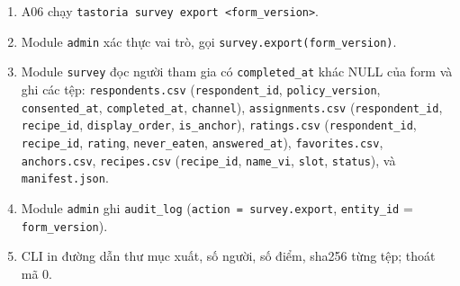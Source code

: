 \begin{enumerate}
\item A06 chạy {\small\texttt{tastoria survey export <form\_\allowbreak{}\allowbreak{}version>}}.
\item Module {\small\texttt{admin}} xác thực vai trò, gọi {\small\texttt{survey.\allowbreak{}export(form\_\allowbreak{}\allowbreak{}version)}}.
\item Module {\small\texttt{survey}} đọc người tham gia có {\small\texttt{completed\_\allowbreak{}\allowbreak{}at}} khác NULL của form và ghi các tệp: {\small\texttt{respondents.\allowbreak{}csv}} ({\small\texttt{respondent\_\allowbreak{}\allowbreak{}id}}, {\small\texttt{policy\_\allowbreak{}\allowbreak{}version}}, {\small\texttt{consented\_\allowbreak{}\allowbreak{}at}}, {\small\texttt{completed\_\allowbreak{}\allowbreak{}at}}, {\small\texttt{channel}}), {\small\texttt{assignments.\allowbreak{}csv}} ({\small\texttt{respondent\_\allowbreak{}\allowbreak{}id}}, {\small\texttt{recipe\_\allowbreak{}\allowbreak{}id}}, {\small\texttt{display\_\allowbreak{}\allowbreak{}order}}, {\small\texttt{is\_\allowbreak{}\allowbreak{}anchor}}), {\small\texttt{ratings.\allowbreak{}csv}} ({\small\texttt{respondent\_\allowbreak{}\allowbreak{}id}}, {\small\texttt{recipe\_\allowbreak{}\allowbreak{}id}}, {\small\texttt{rating}}, {\small\texttt{never\_\allowbreak{}\allowbreak{}eaten}}, {\small\texttt{answered\_\allowbreak{}\allowbreak{}at}}), {\small\texttt{favorites.\allowbreak{}csv}}, {\small\texttt{anchors.\allowbreak{}csv}}, {\small\texttt{recipes.\allowbreak{}csv}} ({\small\texttt{recipe\_\allowbreak{}\allowbreak{}id}}, {\small\texttt{name\_\allowbreak{}\allowbreak{}vi}}, {\small\texttt{slot}}, {\small\texttt{status}}), và {\small\texttt{manifest.\allowbreak{}json}}.
\item Module {\small\texttt{admin}} ghi {\small\texttt{audit\_\allowbreak{}\allowbreak{}log}} ({\small\texttt{action = survey.\allowbreak{}export}}, {\small\texttt{entity\_\allowbreak{}\allowbreak{}id}} = {\small\texttt{form\_\allowbreak{}\allowbreak{}version}}).
\item CLI in đường dẫn thư mục xuất, số người, số điểm, sha256 từng tệp; thoát mã 0.
\end{enumerate}
